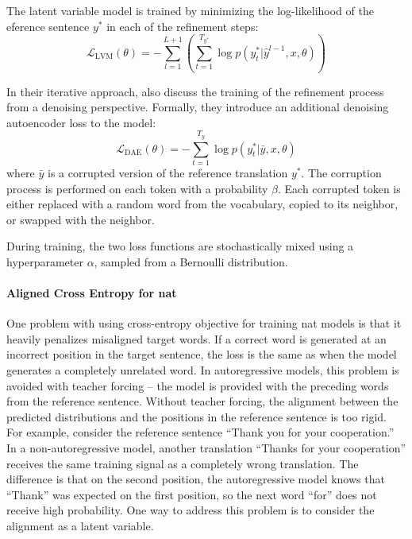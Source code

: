 The latent variable model is trained by minimizing the log-likelihood of the
eference sentence $y^*$ in each of the refinement steps:
\begin{equation}
  \mathcal{L}_{\text{LVM}}(\theta) = - \sum_{l=1}^{L+1} \left(
    \sum_{t=1}^{T_{y^*}} \log p(y_t^* | \hat{y}^{l-1}, x, \theta)
  \right) \label{eq:refinement-lvm-loss}
\end{equation}

In their iterative approach, \citet{lee-etal-2018-deterministic} also discuss
the training of the refinement process from a denoising perspective. Formally,
they introduce an additional denoising autoencoder loss to the model:
%
\begin{equation}
  \mathcal{L}_{\text{DAE}}(\theta) = - \sum_{t=1}^{T_y} \log p(y_t^* | \bar{y}, x, \theta)
\end{equation}
where $\bar{y}$ is a corrupted version of the reference translation $y^*$. The
corruption process is performed on each token with a probability $\beta$. Each
corrupted token is either replaced with a random word from the vocabulary,
copied to its neighbor, or swapped with the neighbor.

During training, the two loss functions are stochastically mixed using a
hyperparameter $\alpha$, sampled from a Bernoulli distribution.


\paragraph{Aligned Cross Entropy for \ac{nat}} One problem with using
cross-entropy objective for training \ac{nat} models is that it heavily
penalizes misaligned target words. If a correct word is generated at an
incorrect position in the target sentence, the loss is the same as when the
model generates a completely unrelated word. In autoregressive models, this
problem is avoided with teacher forcing -- the model is provided with the
preceding words from the reference sentence. Without teacher forcing, the
alignment between the predicted distributions and the positions in the
reference sentence is too rigid. For example, consider the reference sentence
``Thank you for your cooperation.'' In a non-autoregressive model, another
translation ``Thanks for your cooperation'' receives the same training signal
as a completely wrong translation. The difference is that on the second
position, the autoregressive model knows that ``Thank'' was expected on the
first position, so the next word ``for'' does not receive high probability.
One way to address this problem is to consider the alignment as a latent
variable.

